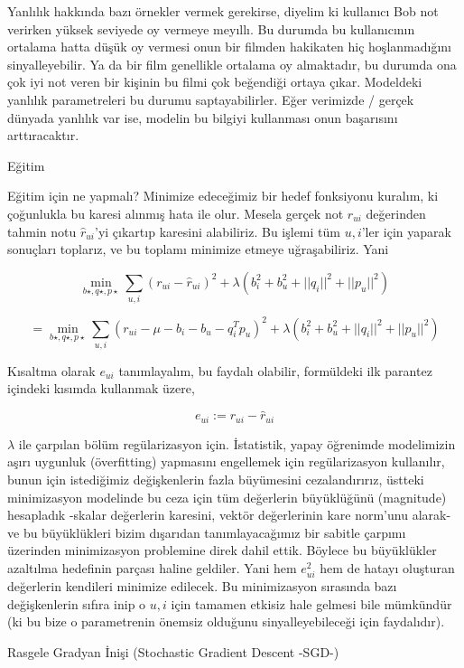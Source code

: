\documentclass[12pt,fleqn]{article}\usepackage{../../common}
\begin{document}
Yanlılık hakkında bazı örnekler vermek gerekirse, diyelim ki kullanıcı Bob not
verirken yüksek seviyede oy vermeye meyıllı. Bu durumda bu kullanıcının ortalama
hatta düşük oy vermesi onun bir filmden hakikaten hiç hoşlanmadığını
sinyalleyebilir. Ya da bir film genellikle ortalama oy almaktadır, bu durumda
ona çok iyi not veren bir kişinin bu filmi çok beğendiği ortaya çıkar. Modeldeki
yanlılık parametreleri bu durumu saptayabilirler. Eğer verimizde / gerçek
dünyada yanlılık var ise, modelin bu bilgiyi kullanması onun başarısını
arttıracaktır.

Eğitim

Eğitim için ne yapmalı? Minimize edeceğimiz bir hedef fonksiyonu kuralım, ki
çoğunlukla bu karesi alınmış hata ile olur. Mesela gerçek not $r_{ui}$
değerinden tahmin notu $\hat{r}_{ui}$'yi çıkartıp karesini alabiliriz. Bu işlemi
tüm $u,i$'ler için yaparak sonuçları toplarız, ve bu toplamı minimize etmeye
uğraşabiliriz. Yani

$$
\min_{b\star,q\star,p\star} \sum_{u,i} (r_{ui} - \hat{r}_{ui})^2 + 
\lambda (b_i^2 + b_u^2 + ||q_i||^2 + ||p_u||^2)
$$

$$
= \min_{b\star,q\star,p\star} \sum_{u,i} (r_{ui} - \mu - b_i - b_u - q_i^Tp_u)^2 + 
\lambda (b_i^2 + b_u^2 + ||q_i||^2 + ||p_u||^2)
$$

Kısaltma olarak $e_{ui}$ tanımlayalım, bu faydalı olabilir, formüldeki ilk
parantez içindeki kısımda kullanmak üzere,

$$ e_{ui} := r_{ui} - \hat{r}_{ui} $$

$\lambda$ ile çarpılan bölüm regülarizasyon için. İstatistik, yapay öğrenimde
modelimizin aşırı uygunluk (överfitting) yapmasını engellemek için
regülarizasyon kullanılır, bunun için istediğimiz değişkenlerin fazla büyümesini
cezalandırırız, üstteki minimizasyon modelinde bu ceza için tüm değerlerin
büyüklüğünü (magnitude) hesapladık -skalar değerlerin karesini, vektör
değerlerinin kare norm'unu alarak- ve bu büyüklükleri bizim dışarıdan
tanımlayacağımız bir sabitle çarpımı üzerinden minimizasyon problemine direk
dahil ettik. Böylece bu büyüklükler azaltılma hedefinin parçası haline
geldiler. Yani hem $e_{ui}^2$ hem de hatayı oluşturan değerlerin kendileri
minimize edilecek. Bu minimizasyon sırasında bazı değişkenlerin sıfıra inip o
$u,i$ için tamamen etkisiz hale gelmesi bile mümkündür (ki bu bize o
parametrenin önemsiz olduğunu sinyalleyebileceği için faydalıdır).

Rasgele Gradyan İnişi (Stochastic Gradient Descent -SGD-)
\end{document}
